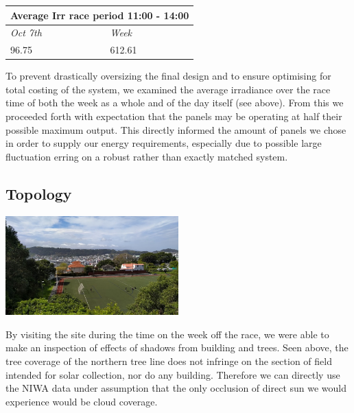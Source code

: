 \documentclass[11pt]{article}
\begin{document}
\begin{table}[h!]
    \begin{center}
        \begin{tabular}{|l|l|}
            \hline
            \multicolumn{2}{|c|}{\textbf{Average Irr race period 11:00 - 14:00}} \\ \hline
            \textit{Oct 7th}                   & \textit{Week}                   \\ \hline
            96.75                              & 612.61                          \\ \hline
        \end{tabular}
    \end{center}
\end{table}

To prevent drastically oversizing the final design and to ensure optimising for total costing of the system, we examined the average irradiance over the race time of both the week as a whole and of the day itself (see above). From this we proceeded forth with expectation that the panels may be operating at half their possible maximum output. This directly informed the amount of panels we chose in order to supply our energy requirements, especially due to possible large fluctuation erring on a robust rather than exactly matched system.

\subsection{Topology}

\begin{center}
    \includegraphics[width=0.5\textwidth]{inc/IMG20201006120746.jpg}
\end{center}

By visiting the site during the time on the week off the race, we were able to make an inspection of effects of shadows from building and trees. Seen above, the tree coverage of the northern tree line does not infringe on the section of field intended for solar collection, nor do any building. Therefore we can directly use the NIWA data under assumption that the only occlusion of direct sun we would experience would be cloud coverage.
\end{document}
